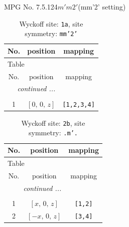 \documentclass[fleqn,8pt]{jsarticle}
\begin{document}
\setcounter{MaxMatrixCols}{32}

\renewcommand{\tablename}{Table~}
\renewcommand{\figurename}{Figure~}
\begin{center}
\LARGE
MPG No. 7.5.124\quad$m'm2'$\quad(mm'2' setting)
\end{center}
\renewcommand{\arraystretch}{1.2}
\begin{longtable}{ccc}
\caption{Wyckoff site: {\tt 1a}, site symmetry: {\tt mm'2'}}
 \\
 \hline \hline
No. & position & mapping \\ \hline \endfirsthead

\multicolumn{2}{l}{\tablename\ \thetable{}} \\
 \hline \hline
No. & position & mapping \\ \hline \endhead

 \hline \hline
\multicolumn{2}{r}{\footnotesize\it continued ...} \\ \endfoot

 \hline \hline
\multicolumn{2}{r}{} \\ \endlastfoot

1 & $\left[ 0,\, 0,\, z \right]$ & {\tt [1,2,3,4]} \\
\end{longtable}
\renewcommand{\arraystretch}{1.2}
\begin{longtable}{ccc}
\caption{Wyckoff site: {\tt 2b}, site symmetry: {\tt .m'.}}
 \\
 \hline \hline
No. & position & mapping \\ \hline \endfirsthead

\multicolumn{2}{l}{\tablename\ \thetable{}} \\
 \hline \hline
No. & position & mapping \\ \hline \endhead

 \hline \hline
\multicolumn{2}{r}{\footnotesize\it continued ...} \\ \endfoot

 \hline \hline
\multicolumn{2}{r}{} \\ \endlastfoot

1 & $\left[ x,\, 0,\, z \right]$ & {\tt [1,2]} \\ \hline
2 & $\left[ - x,\, 0,\, z \right]$ & {\tt [3,4]} \\
\end{longtable}
\renewcommand{\arraystretch}{1.2}
\end{document}
